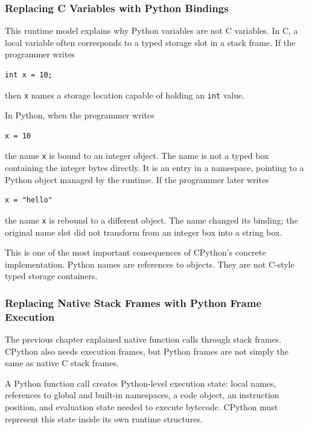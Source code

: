 \subsubsection{Replacing C Variables with Python Bindings}

This runtime model explains why Python variables are not C variables. In C, a local variable often corresponds to a typed storage slot in a stack frame. If the programmer writes

\begin{verbatim}
int x = 10;
\end{verbatim}

then \texttt{x} names a storage location capable of holding an \texttt{int} value.

In Python, when the programmer writes

\begin{verbatim}
x = 10
\end{verbatim}

the name \texttt{x} is bound to an integer object. The name is not a typed box containing the integer bytes directly. It is an entry in a namespace, pointing to a Python object managed by the runtime. If the programmer later writes

\begin{verbatim}
x = "hello"
\end{verbatim}

the name \texttt{x} is rebound to a different object. The name changed its binding; the original name slot did not transform from an integer box into a string box.

This is one of the most important consequences of CPython's concrete implementation. Python names are references to objects. They are not C-style typed storage containers.

\subsubsection{Replacing Native Stack Frames with Python Frame Execution}

The previous chapter explained native function calls through stack frames. CPython also needs execution frames, but Python frames are not simply the same as native C stack frames.

A Python function call creates Python-level execution state: local names, references to global and built-in namespaces, a code object, an instruction position, and evaluation state needed to execute bytecode. CPython must represent this state inside its own runtime structures.

